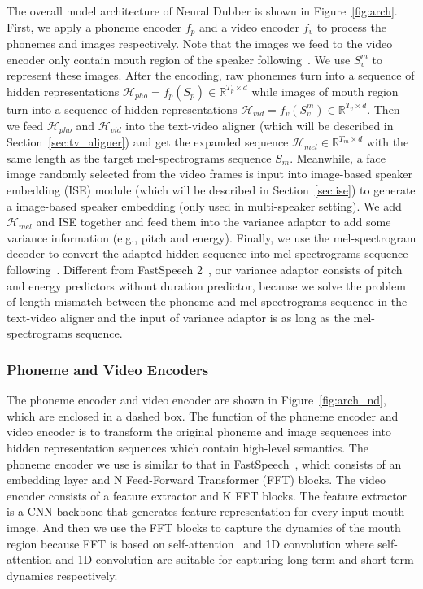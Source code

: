\documentclass{article}
\begin{document}
The overall model architecture of Neural Dubber is shown in Figure~\ref{fig:arch}.
First, we apply a phoneme encoder $f_p$ and a video encoder $f_v$  to process the phonemes and images respectively. Note that the images we feed to the video encoder only contain mouth region of the speaker following~\cite{chung2017lip,petridis2018end,stafylakis2017combining}. We use $S_{v}^{m}$ to represent these images.
After the encoding, raw phonemes turn into a sequence of hidden representations $\mathcal{H}_{pho} = f_{p}(S_p) \in \mathbb{R}^{T_p \times d}$ while images of mouth region turn into a sequence of hidden representations $\mathcal{H}_{vid} = f_{v}(S_v^m) \in \mathbb{R}^{T_v \times d}$. Then we feed $\mathcal{H}_{pho}$ and $\mathcal{H}_{vid}$ into the text-video aligner (which will be described in Section~\ref{sec:tv_aligner}) and get the expanded sequence $\mathcal{H}_{mel} \in  \mathbb{R}^{T_m \times d}$ with the same length as the target mel-spectrograms sequence $S_m$.
Meanwhile, a face image randomly selected from the video frames is input into image-based speaker embedding (ISE) module (which will be described in Section~\ref{sec:ise}) to generate a image-based speaker embedding (only used in multi-speaker setting).
We add $\mathcal{H}_{mel}$ and ISE together and feed them into the variance adaptor to add some variance information (e.g., pitch and energy). Finally, we use the mel-spectrogram decoder to convert the adapted hidden sequence into mel-spectrograms sequence following~\cite{ren2019fastspeech}.
Different from FastSpeech 2~\cite{ren2021fastspeech}, our variance adaptor consists of pitch and energy predictors without duration predictor, because we solve the problem of length mismatch between the phoneme and mel-spectrograms sequence in the text-video aligner and the input of variance adaptor is as long as the mel-spectrograms sequence.



\subsubsection{Phoneme and Video Encoders}
The phoneme encoder and video encoder are shown in Figure~\ref{fig:arch_nd}, which are enclosed in a dashed box.
The function of the phoneme encoder and video encoder is to transform the original phoneme and image sequences into hidden representation sequences which contain high-level semantics.
The phoneme encoder we use is similar to that in FastSpeech~\cite{ren2019fastspeech}, which consists of an embedding layer and N Feed-Forward Transformer (FFT) blocks. The video encoder consists of a feature extractor and K FFT blocks. The feature extractor is a CNN backbone that generates feature representation for every input mouth image. And then we use the FFT blocks to capture the dynamics of the mouth region because FFT is based on self-attention~\cite{vaswani2017attention} and 1D convolution where self-attention and 1D convolution are suitable for capturing long-term and short-term dynamics respectively.
\end{document}
